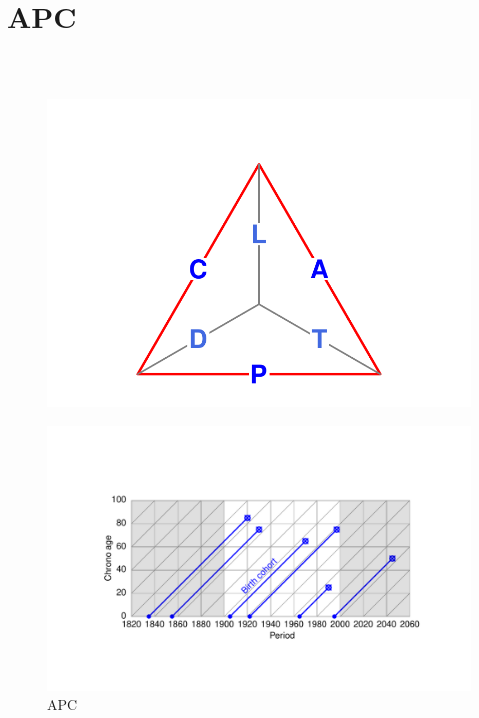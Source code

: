 \documentclass[20pt]{beamer}
\begin{document}
\section{APC}
\begin{frame}
\frametitle{~}
\vspace{-6em}
\begin{figure}
\raggedleft
    \includegraphics[scale=.7]{Figures/TetraAPCprg.pdf}
\end{figure}
\vspace{-3em}
\begin{figure}[b]
    \centering
    \caption{APC}
    \includegraphics{Figures/LabPres/APC4.pdf}
\end{figure} 
\end{frame}
\end{document}

